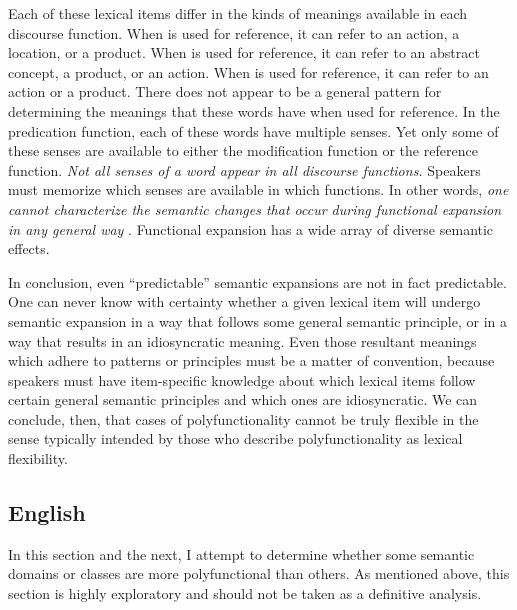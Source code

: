 Each of these lexical items differ in the kinds of meanings available in each discourse function. When  is used for reference, it can refer to an action, a location, or a product. When  is used for reference, it can refer to an abstract concept, a product, or an action. When  is used for reference, it can refer to an action or a product. There does not appear to be a general pattern for determining the meanings that these words have when used for reference. In the predication function, each of these words have multiple senses. Yet only some of these senses are available to either the modification function or the reference function. \emph{Not all senses of a word appear in all discourse functions.} Speakers must memorize which senses are available in which functions. In other words, \emph{one cannot characterize the semantic changes that occur during functional expansion in any general way} \parencite{Mithun2017}. Functional expansion has a wide array of diverse semantic effects.

In conclusion, even \enquote{predictable} semantic expansions are not in fact predictable. One can never know with certainty whether a given lexical item will undergo semantic expansion in a way that follows some general semantic principle, or in a way that results in an idiosyncratic meaning. Even those resultant meanings which adhere to patterns or principles must be a matter of convention, because speakers must have item-specific knowledge about which lexical items follow certain general semantic principles and which ones are idiosyncratic. We can conclude, then, that cases of polyfunctionality cannot be truly flexible in the sense typically intended by those who describe polyfunctionality as lexical flexibility.

\subsection{English}
\label{sec:4.6.2}

In this section and the next, I attempt to determine whether some semantic domains or classes are more polyfunctional than others. As mentioned above, this section is highly exploratory and should not be taken as a definitive analysis.

